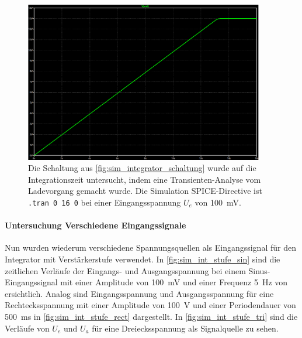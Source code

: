 \documentclass[12pt,english,ngerman]{scrartcl}
\begin{document}
\begin{figure}[H]
  \centering
    \includegraphics[width=\linewidth, height=7cm]{./figures/integrator/sim/mit_stufe/100mv_aus_zeit.png}
  \caption{Die Schaltung aus \autoref{fig:sim_integrator_schaltung} wurde auf
  die Integrationszeit untersucht, indem eine Transienten-Analyse vom
  Ladevorgang gemacht wurde. Die Simulation SPICE-Directive ist \texttt{.tran 0 16 0} 
  bei einer Eingangsspannung $U_e$ von \SI{100}{\milli\volt}.}
  \label{fig:sim_integrator_stufe_integrationszeit}
\end{figure}

\paragraph{Untersuchung Verschiedene Eingangssignale}
Nun wurden wiederum verschiedene Spannungsquellen als Eingangssignal für den
Integrator mit Verstärkerstufe verwendet. In \autoref{fig:sim_int_stufe_sin}
sind die zeitlichen Verläufe der Eingangs- und Ausgangsspannung bei einem
Sinus-Eingangssignal mit einer Amplitude von \SI{100}{\milli\volt} und einer
Frequenz \SI{5}{\hertz} von ersichtlich. Analog sind Eingangsspannung und
Ausgangsspannung für eine Rechtecksspannung mit einer Amplitude von
\SI{100}{\volt} und einer Periodendauer von \SI{500}{\milli\second} in
\autoref{fig:sim_int_stufe_rect} dargestellt. In
\autoref{fig:sim_int_stufe_tri} sind die Verläufe von $U_e$ und $U_a$ für eine
Dreiecksspannung als Signalquelle zu sehen.
\end{document}
